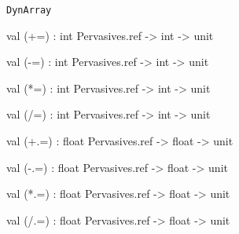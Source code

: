 \documentclass[11pt]{article}
\begin{document}
{\tt{DynArray}}





\label{val:Util.(-plus-equal)}\begin{ocamldoccode}
val (+=) : int Pervasives.ref -> int -> unit
\end{ocamldoccode}




\label{val:Util.(-minus-equal)}\begin{ocamldoccode}
val (-=) : int Pervasives.ref -> int -> unit
\end{ocamldoccode}




\label{val:Util.(-star-equal)}\begin{ocamldoccode}
val (*=) : int Pervasives.ref -> int -> unit
\end{ocamldoccode}




\label{val:Util.(-slash-equal)}\begin{ocamldoccode}
val (/=) : int Pervasives.ref -> int -> unit
\end{ocamldoccode}




\label{val:Util.(-plus.-equal)}\begin{ocamldoccode}
val (+.=) : float Pervasives.ref -> float -> unit
\end{ocamldoccode}




\label{val:Util.(-minus.-equal)}\begin{ocamldoccode}
val (-.=) : float Pervasives.ref -> float -> unit
\end{ocamldoccode}




\label{val:Util.(-star.-equal)}\begin{ocamldoccode}
val (*.=) : float Pervasives.ref -> float -> unit
\end{ocamldoccode}




\label{val:Util.(-slash.-equal)}\begin{ocamldoccode}
val (/.=) : float Pervasives.ref -> float -> unit
\end{ocamldoccode}
\end{document}
